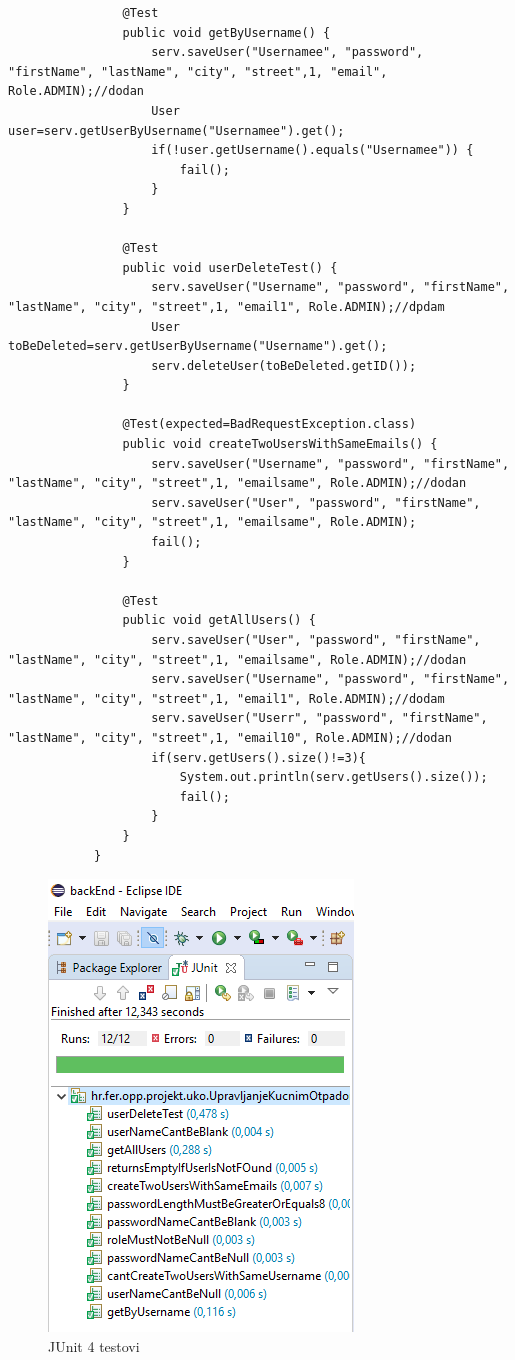\begin{lstlisting}
				@Test
				public void getByUsername() {
					serv.saveUser("Usernamee", "password", "firstName", "lastName", "city", "street",1, "email", Role.ADMIN);//dodan
					User user=serv.getUserByUsername("Usernamee").get();
					if(!user.getUsername().equals("Usernamee")) {
						fail();
					}
				}
				
				@Test
				public void userDeleteTest() {
					serv.saveUser("Username", "password", "firstName", "lastName", "city", "street",1, "email1", Role.ADMIN);//dpdam
					User toBeDeleted=serv.getUserByUsername("Username").get();
					serv.deleteUser(toBeDeleted.getID());
				}
				
				@Test(expected=BadRequestException.class)
				public void createTwoUsersWithSameEmails() {
					serv.saveUser("Username", "password", "firstName", "lastName", "city", "street",1, "emailsame", Role.ADMIN);//dodan
					serv.saveUser("User", "password", "firstName", "lastName", "city", "street",1, "emailsame", Role.ADMIN);
					fail();
				}
				
				@Test
				public void getAllUsers() {
					serv.saveUser("User", "password", "firstName", "lastName", "city", "street",1, "emailsame", Role.ADMIN);//dodan
					serv.saveUser("Username", "password", "firstName", "lastName", "city", "street",1, "email1", Role.ADMIN);//dodam
					serv.saveUser("Userr", "password", "firstName", "lastName", "city", "street",1, "email10", Role.ADMIN);//dodan
					if(serv.getUsers().size()!=3){
						System.out.println(serv.getUsers().size());
						fail();
					}
				}
			}
			\end{lstlisting}
			\begin{figure}[H]
				\includegraphics{slike/JUnit 4 testovi.png}
				\centering
				\caption{JUnit 4 testovi}
				\label{fig:JUnit 4 testovi}
			\end{figure}

